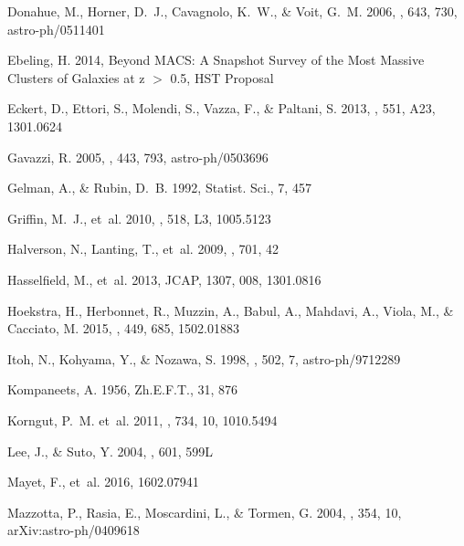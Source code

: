 \documentclass[traditabstract]{aa}
\begin{document}
\begin{thebibliography}{81}
Donahue, M., Horner, D.~J., Cavagnolo, K.~W., \& Voit, G.~M. 2006, \apj, 643,
  730, astro-ph/0511401

{Ebeling}, H. 2014, {Beyond MACS: A Snapshot Survey of the Most Massive
  Clusters of Galaxies at z $>$ 0.5}, HST Proposal

{Eckert}, D., {Ettori}, S., {Molendi}, S., {Vazza}, F., \& {Paltani}, S. 2013,
  \aap, 551, A23, 1301.0624

Gavazzi, R. 2005, \aap, 443, 793, astro-ph/0503696

Gelman, A., \& Rubin, D.~B. 1992, Statist. Sci., 7, 457

Griffin, M.~J., {et~al.} 2010, \aap, 518, L3, 1005.5123

Halverson, N., Lanting, T., {et~al.} 2009, \apj, 701, 42

Hasselfield, M., {et~al.} 2013, JCAP, 1307, 008, 1301.0816

{Hoekstra}, H., {Herbonnet}, R., {Muzzin}, A., {Babul}, A., {Mahdavi}, A.,
  {Viola}, M., \& {Cacciato}, M. 2015, \mnras, 449, 685, 1502.01883

Itoh, N., Kohyama, Y., \& Nozawa, S. 1998, \apj, 502, 7, astro-ph/9712289

{Kompaneets}, A. 1956, Zh.E.F.T., 31, 876

{Korngut}, P.~M. {et~al.} 2011, \apj, 734, 10, 1010.5494

Lee, J., \& Suto, Y. 2004, \apj, 601, 599L

Mayet, F., {et~al.} 2016, 1602.07941

{Mazzotta}, P., {Rasia}, E., {Moscardini}, L., \& {Tormen}, G. 2004, \mnras,
  354, 10, arXiv:astro-ph/0409618


\end{thebibliography}
\end{document}
